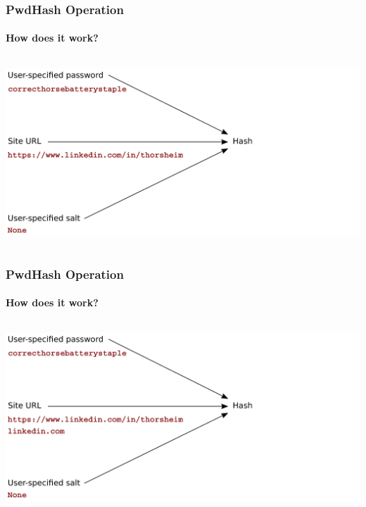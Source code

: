 \documentclass[handout, notes=hide]{beamer}
\begin{document}
\begin{frame}
\frametitle{PwdHash Operation}
\framesubtitle{How does it work?}
\setlength{\parskip}{0.5em}

\begin{columns}[T]
\begin{column}[T]{1.1\textwidth}
\vspace{0.0em}
\includegraphics[width=1.0\textwidth]{process02}
\end{column}
\end{columns}


\end{frame}


\begin{frame}
\frametitle{PwdHash Operation}
\framesubtitle{How does it work?}
\setlength{\parskip}{0.5em}

\begin{columns}[T]
\begin{column}[T]{1.1\textwidth}
\vspace{0.0em}
\includegraphics[width=1.0\textwidth]{process03}
\end{column}
\end{columns}


\end{frame}
\end{document}
